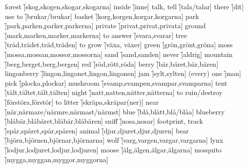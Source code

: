 \begin{questions}
    \begin{multicols}{2}
        \raggedcolumns
        \question forest \f[skog,skogen,skogar,skogarna]
        \question inside \f[inne]
        \question talk, tell \f[tala/talar]
        \question there \f[dit]
        \question use to \f[brukar/brukar] 
        \question basket \f[korg,korgen,korgar,korgarna]
        \question park \f[park,parken,parker,parkerna]
        \question private \f[privat,privat,privata]
        \question ground \f[mark,marken,marker,markerna]
        \question to answer \f[svara,svarar]
        \question tree \f[träd,trädet,träd,träden]
        \question to grow \f[växa, växer]
        \question green \f[grön,grönt,gröna]
        \question moss \f[mossa,mossan,mossor,mossorna]
        \question sand \f[sand,sanden]
        \question never \f[aldrig]
        \question mountain \f[berg,berget,berg,bergen]
        \question red \f[röd,rött,röda]
        \question berry \f[bär,bäret,bär,bären]
        \question lingonberry \f[lingon,lingonet,lingon,lingonen]
        \question jam \f[sylt,sylten]
        \question (every) one \f[man]
        \question pick \f[plocka,plockar]
        \question mushroom \f[svamp,svampen,svampar,svamparna]
        \question tent \f[tält,tältet,tält,tälten]
        \question night \f[natt,natten,nätter,nätterna]
        \question to ruin/destroy \f[förstöra,förstör]
        \question to litter \f[skräpa,skräpar(ner)]
        \question near \f[när,närmare/närmre,närmast/närmst]
        \question blue \f[blå,blått,blå/blåa]
        \question blueberry \f[blåbär,blåbäret,blåbär,blåbären]
        \question sniff \f[nosa,nosar]
        \question footprint, track \f[spår,spåret,spår,spåren]
        \question animal \f[djur,djuret,djur,djuren]
        \question bear \f[björn,björnen,björnar,björnarna]
        \question wolf \f[varg,vargen,vargar,vargarna]
        \question lynx \f[lodjur,lodjuret,lodjur,lodjuren]
        \question moose \f[älg,älgen,älgar,älgarna]
        \question mosquito \f[mygga,myggan,myggor,myggorna]
    \end{multicols}
\end{questions}
